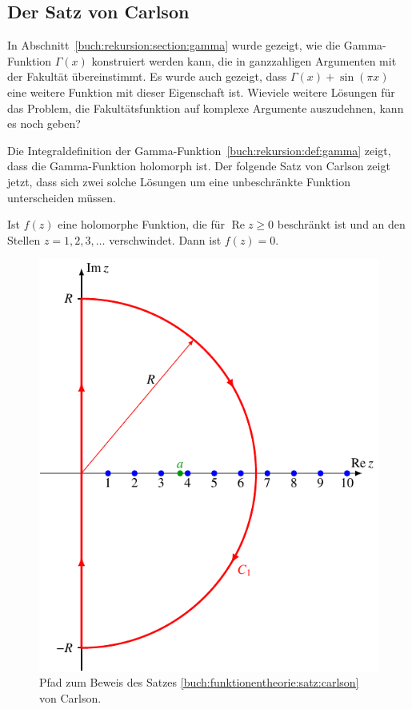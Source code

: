 %
%
%
\subsection{Der Satz von Carlson
\label{buch:funktionentheorie:subsection:satz-von-carlson}}
In Abschnitt~\ref{buch:rekursion:section:gamma} wurde gezeigt,
wie die Gamma-Funktion $\Gamma(x)$ konstruiert werden kann, die
in ganzzahligen Argumenten mit der Fakultät übereinstimmt.
Es wurde auch gezeigt, dass $\Gamma(x)+\sin(\pi x)$ eine
weitere Funktion mit dieser Eigenschaft ist.
Wieviele weitere Lösungen für das Problem, die Fakultätsfunktion
auf komplexe Argumente auszudehnen, kann es noch geben?

Die Integraldefinition der
Gamma-Funktion~\ref{buch:rekursion:def:gamma} zeigt, dass
die Gamma-Funktion holomorph ist.
Der folgende Satz von Carlson zeigt jetzt, dass sich
zwei solche Lösungen um eine unbeschränkte Funktion
unterscheiden müssen.

\begin{satz}[Carlson]
\label{buch:funktionentheorie:satz:carlson}
Ist $f(z)$ eine holomorphe Funktion, die für $\operatorname{Re}z\ge 0$
beschränkt ist und an den Stellen $z=1,2,3,\dots$ verschwindet.
Dann ist $f(z)=0$.
\end{satz}

%
%
\begin{figure}
\centering
\includegraphics{chapters/080-funktionentheorie/images/carlsonpath.pdf}
\caption{Pfad zum Beweis des Satzes \ref{buch:funktionentheorie:satz:carlson}
von Carlson.
\label{buch:funktionentheorie:fig:carlsonpath}}
\end{figure}


